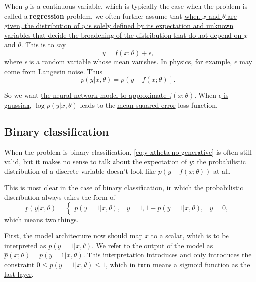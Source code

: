 \documentclass[hyperref, a4paper, 12pt]{report}
\newcommand*{\concept}[1]{{\textbf{#1}}}
\def\\{}%
\begin{document}
When $y$ is a continuous variable,
which is typically the case when the problem is called a \concept{regression} problem,
we often further assume that \uline{when $x$ and $\theta$ are given, the distribution of $y$ is solely defined by its expectation and unknown variables that decide the broadening of the distribution that do not depend on $x$ and $\theta$}.
This is to say 
\begin{equation}
    y = f(x; \theta) + \epsilon,
\end{equation}
where $\epsilon$ is a random variable whose mean vanishes.
In physics, for example, $\epsilon$ may come from Langevin noise.
Thus 
\begin{equation}
    p(y | x, \theta) = p(y - f(x; \theta)).
\end{equation}

So we want \uline{the neural network model to approximate $f(x; \theta)$}.
When \uline{$\epsilon$ is gaussian}, $\log p(y | x, \theta)$ leads to the \uline{mean squared error} loss function.

\subsection{Binary classification}

When the problem is binary classification, \eqref{eq:y-xtheta-no-generative} is often still valid,
but it makes no sense to talk about the expectation of $y$:
the probabilistic distribution of a discrete variable doesn't look like $p(y - f(x; \theta))$ at all.

This is most clear in the case of binary classification, in which the probabilistic distribution always takes the form of 
\begin{equation}
    p(y| x, \theta) = \begin{cases}
        p(y = 1 | x, \theta)     , & y = 1, \\
        1 - p(y = 1 | x, \theta)  , & y = 0,
    \end{cases}
\end{equation}
which means two things.

First, the model architecture now should map $x$ to a scalar,
which is to be interpreted as $p(y = 1 | x, \theta)$.
\uline{We refer to the output of the model as $\hat{p}(x; \theta) = p(y = 1 | x, \theta)$}.
This interpretation introduces and only introduces the constraint $0 \leq p(y = 1 | x, \theta) \leq 1$,
which in turn means \uline{a sigmoid function as the last layer}.
\end{document}
